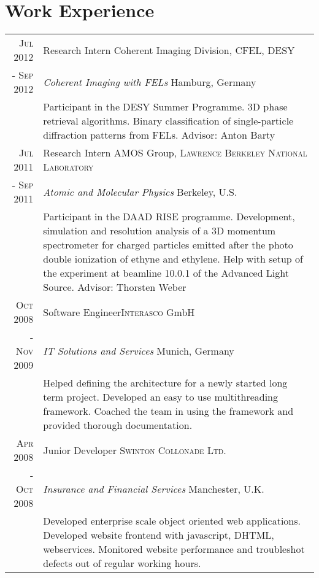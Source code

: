 \documentclass[a4paper,10pt]{article}
\begin{document}
\section{Work Experience}
\begin{tabularx}{19cm}{rX}

 \textsc{Jul 2012} & Research Intern \hfill Coherent Imaging Division, \textsc{CFEL, DESY}\\
\textsc{- Sep 2012} &\emph{Coherent Imaging with FELs} \hfill Hamburg, Germany\\
&\footnotesize{Participant in the DESY Summer Programme. 3D phase retrieval algorithms. Binary classification of single-particle diffraction patterns from FELs. Advisor: Anton Barty}\vspace{2mm}\\ 

 \textsc{Jul 2011} & Research Intern \hfill AMOS Group, \textsc{Lawrence Berkeley National Laboratory}\\
\textsc{- Sep 2011} &\emph{Atomic and Molecular Physics} \hfill Berkeley, U.S.\\
&\footnotesize{Participant in the DAAD RISE programme. Development, simulation and resolution analysis of a 3D momentum spectrometer for charged particles emitted
after the photo double ionization of ethyne and ethylene. Help with setup of the experiment at beamline 10.0.1 of
the Advanced Light Source. Advisor: Thorsten Weber}\vspace{2mm}\\ 

 \textsc{Oct 2008} & Software Engineer\hfill \textsc{Interasco} GmbH
 \\\textsc{- Nov 2009}&\emph{IT Solutions and Services} \hfill Munich, Germany\\&\footnotesize{Helped defining the architecture for a newly started long term project. Developed an easy to use multithreading framework. Coached the team in using the framework and provided thorough documentation.}\vspace{2mm}\\ 

 \textsc{Apr 2008} & Junior Developer \hfill \textsc{Swinton Collonade Ltd.} \\
\textsc{- Oct 2008}&\emph{Insurance and Financial Services} \hfill  Manchester, U.K.\\
&\footnotesize{Developed enterprise scale object oriented web applications. Developed website frontend with javascript, DHTML, webservices. Monitored website performance and troubleshot defects out of regular working hours.}\vspace{2mm}\\ 


\end{tabularx}
\end{document}
